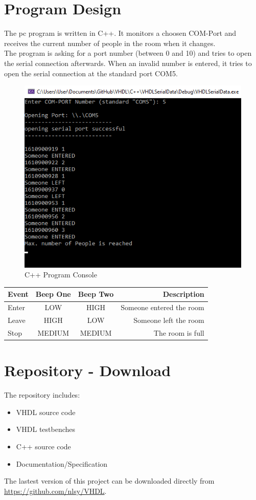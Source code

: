 \documentclass[12pt,a4 paper] {report}
\begin{document}
\chapter{Program Design}
The pc program is written in C++. It monitors a choosen COM-Port and receives the current number of people in the room when it changes.\\
The program is asking for a port number (between 0 and 10) and tries to open the serial connection afterwards. When an invalid number is entered, it tries to open the serial connection at the standard port COM5.
\begin{figure}[h]
	\centering	
	\includegraphics[scale=0.8]{../png/program.png}
	\caption{C++ Program Console}
\end{figure}
\begin{center}
	\begin{tabular}{|l|c|c|r|}
		\hline
		\textbf{Event} & \textbf{Beep One} & \textbf{Beep Two} & \textbf{Description} \\
		\hline
		Enter & LOW & HIGH & Someone entered the room \\
		\hline
		Leave & HIGH & LOW & Someone left the room \\
		\hline
		Stop & MEDIUM & MEDIUM & The room is full \\
		\hline
	\end{tabular}
\end{center}

\newpage

\chapter{Repository - Download}
The repository includes:
\begin{itemize}
	\item VHDL source code
	\item VHDL testbenches
	\item C++ source code
	\item Documentation/Specification
\end{itemize}
The lastest version of this project can be downloaded directly from \href{https://github.com/nlsy/VHDL}{https://github.com/nlsy/VHDL}. \\
\end{document}
